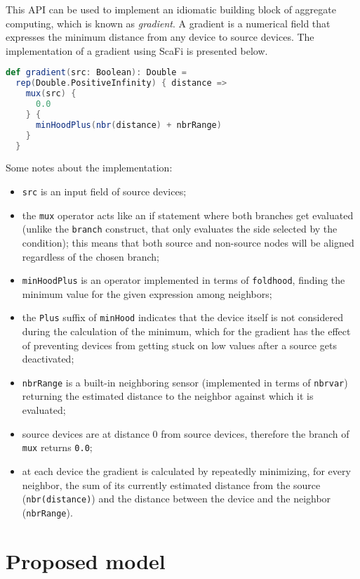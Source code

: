 This API can be used to implement an idiomatic building block of aggregate computing, which is known as \textit{gradient}.
%
A gradient is a numerical field that expresses the minimum distance from any device to source devices.
%
The implementation of a gradient using ScaFi is presented below.
%
\begin{lstlisting}[frame=single, language=scala]
def gradient(src: Boolean): Double =
  rep(Double.PositiveInfinity) { distance =>
    mux(src) {
      0.0
    } {
      minHoodPlus(nbr(distance) + nbrRange)
    }
  }
\end{lstlisting}
%
Some notes about the implementation:
%
\begin{itemize}
    \item \texttt{src} is an input field of source devices;
    \item the \texttt{mux} operator acts like an if statement where both branches get evaluated (unlike the \texttt{branch} construct, that only evaluates the side selected by the condition); this means that both source and non-source nodes will be aligned regardless of the chosen branch;
    \item \texttt{minHoodPlus} is an operator implemented in terms of \texttt{foldhood}, finding the minimum value for the given expression among neighbors;
    \item the \texttt{Plus} suffix of \texttt{minHood} indicates that the device itself is not considered during the calculation of the minimum, which for the gradient has the effect of preventing devices from getting stuck on low values after a source gets deactivated;
    \item \texttt{nbrRange} is a built-in neighboring sensor (implemented in terms of \texttt{nbrvar}) returning the estimated distance to the neighbor against which it is evaluated;
    \item source devices are at distance 0 from source devices, therefore the  branch of \texttt{mux} returns \texttt{0.0};
    \item at each device the gradient is calculated by repeatedly minimizing, for every neighbor, the sum of its currently estimated distance from the source (\texttt{nbr(distance)}) and the distance between the device and the neighbor (\texttt{nbrRange}).
\end{itemize}

\section{Proposed model}
\label{sec:proposed-model}

